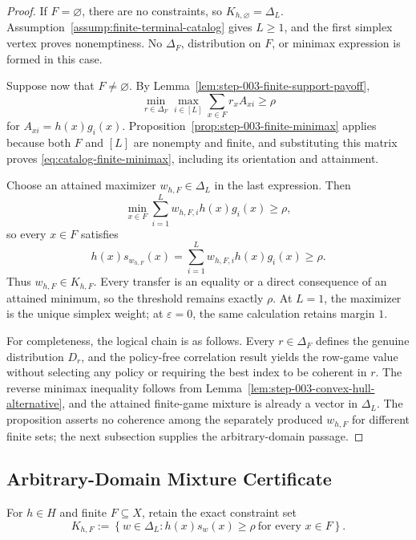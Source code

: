 \begin{proof}
If $F=\varnothing$, there are no constraints, so
$K_{h,\varnothing}=\Delta_L$.  Assumption~\ref{assump:finite-terminal-catalog}
gives $L\ge1$, and the first simplex vertex proves nonemptiness.  No
$\Delta_F$, distribution on $F$, or minimax expression is formed in this
case.

Suppose now that $F\ne\varnothing$.  By
Lemma~\ref{lem:step-003-finite-support-payoff},
\[
\min_{r\in\Delta_F}\max_{i\in[L]}
\sum_{x\in F}r_xA_{xi}\ge\rho
\]
for $A_{xi}=h(x)g_i(x)$.  Proposition~\ref{prop:step-003-finite-minimax}
applies because both $F$ and $[L]$ are nonempty and finite, and substituting
this matrix proves \eqref{eq:catalog-finite-minimax}, including its
orientation and attainment.

Choose an attained maximizer $w_{h,F}\in\Delta_L$ in the last expression.
Then
\[
\min_{x\in F}\sum_{i=1}^Lw_{h,F,i}h(x)g_i(x)\ge\rho,
\]
so every $x\in F$ satisfies
\[
h(x)s_{w_{h,F}}(x)
=\sum_{i=1}^Lw_{h,F,i}h(x)g_i(x)\ge\rho.
\]
Thus $w_{h,F}\in K_{h,F}$.  Every transfer is an equality or a direct
consequence of an attained minimum, so the threshold remains exactly $\rho$.
At $L=1$, the maximizer is the unique simplex weight; at
$\varepsilon=0$, the same calculation retains margin $1$.

For completeness, the logical chain is as follows.  Every
$r\in\Delta_F$ defines the genuine distribution $D_r$, and the policy-free
correlation result yields the row-game value without selecting any policy or
requiring the best index to be coherent in $r$.  The reverse minimax
inequality follows from Lemma~\ref{lem:step-003-convex-hull-alternative}, and
the attained finite-game mixture is already a vector in $\Delta_L$.
The proposition asserts no coherence among the separately produced
$w_{h,F}$ for different finite sets; the next subsection supplies the
arbitrary-domain passage.
\end{proof}

\subsection{Arbitrary-Domain Mixture Certificate}
\label{app:arbitrary-domain-certificate}

For $h\in H$ and finite $F\subseteq X$, retain the exact constraint set
\begin{equation}\label{eq:finite-constraint-set}
K_{h,F}:=\left\{w\in\Delta_L:
h(x)s_w(x)\ge\rho\ \text{for every }x\in F\right\}.
\end{equation}

